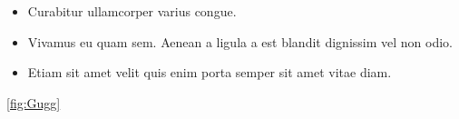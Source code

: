 \begin{itemize}

\renewcommand{\labelitemi}{$\bullet$}

\setlength{\itemindent}{5mm}

    \item Curabitur ullamcorper varius congue.
    \item Vivamus eu quam sem. Aenean a ligula a est blandit dignissim vel non odio.
    \item Etiam sit amet velit quis enim porta semper sit amet vitae diam.

\end{itemize}





\ref{fig:Gugg}

